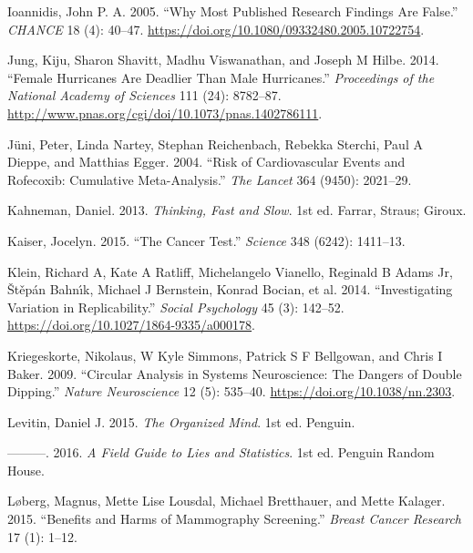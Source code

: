 \documentclass[
  10ptls,
  b5paper]{book}
\newlength{\cslhangindent}
\newlength{\cslentryspacingunit} %
\newenvironment{CSLReferences}[2] %
 {%
  \setlength{\parindent}{0pt}
  \ifodd #1
  \let\oldpar\par
  \def\par{\hangindent=\cslhangindent\oldpar}
  \fi
  \setlength{\parskip}{#2\cslentryspacingunit}
 }%
 {}
\begin{document}
\begin{CSLReferences}{1}{0}
\leavevmode{}%
Ioannidis, John P. A. 2005. {``Why Most Published Research Findings Are False.''} \emph{CHANCE} 18 (4): 40--47. \url{https://doi.org/10.1080/09332480.2005.10722754}.

\leavevmode{}%
Jung, Kiju, Sharon Shavitt, Madhu Viswanathan, and Joseph M Hilbe. 2014. {``Female Hurricanes Are Deadlier Than Male Hurricanes.''} \emph{Proceedings of the National Academy of Sciences} 111 (24): 8782--87. \url{http://www.pnas.org/cgi/doi/10.1073/pnas.1402786111}.

\leavevmode{}%
Jüni, Peter, Linda Nartey, Stephan Reichenbach, Rebekka Sterchi, Paul A Dieppe, and Matthias Egger. 2004. {``Risk of Cardiovascular Events and Rofecoxib: Cumulative Meta-Analysis.''} \emph{The Lancet} 364 (9450): 2021--29.

\leavevmode{}%
Kahneman, Daniel. 2013. \emph{Thinking, Fast and Slow}. 1st ed. Farrar, Straus; Giroux.

\leavevmode{}%
Kaiser, Jocelyn. 2015. {``The Cancer Test.''} \emph{Science} 348 (6242): 1411--13.

\leavevmode{}%
Klein, Richard A, Kate A Ratliff, Michelangelo Vianello, Reginald B Adams Jr, Štěpán Bahnı́k, Michael J Bernstein, Konrad Bocian, et al. 2014. {``Investigating Variation in Replicability.''} \emph{Social Psychology} 45 (3): 142--52. \url{https://doi.org/10.1027/1864-9335/a000178}.

\leavevmode{}%
Kriegeskorte, Nikolaus, W Kyle Simmons, Patrick S F Bellgowan, and Chris I Baker. 2009. {``Circular Analysis in Systems Neuroscience: The Dangers of Double Dipping.''} \emph{Nature Neuroscience} 12 (5): 535--40. \url{https://doi.org/10.1038/nn.2303}.

\leavevmode{}%
Levitin, Daniel J. 2015. \emph{The Organized Mind}. 1st ed. Penguin.

\leavevmode{}%
---------. 2016. \emph{A Field Guide to Lies and Statistics}. 1st ed. Penguin Random House.

\leavevmode{}%
Løberg, Magnus, Mette Lise Lousdal, Michael Bretthauer, and Mette Kalager. 2015. {``Benefits and Harms of Mammography Screening.''} \emph{Breast Cancer Research} 17 (1): 1--12.


\end{CSLReferences}
\end{document}
